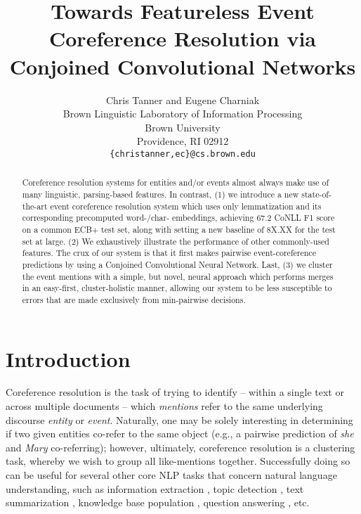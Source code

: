 \documentclass[11pt,a4paper]{article}
\title{Towards Featureless Event Coreference Resolution via Conjoined Convolutional Networks}
\author{Chris Tanner \textnormal{and} Eugene Charniak\\
Brown Linguistic Laboratory of Information Processing \\
  Brown University \\
  Providence, RI  02912 \\
  {\tt \{christanner,ec\}@cs.brown.edu} \\}
\date{}
\begin{document}
\maketitle
\begin{abstract}
Coreference resolution systems for entities and/or events almost always make use of many linguistic, parsing-based features.  In contrast, (1) we introduce a new state-of-the-art event coreference resolution system which uses only lemmatization and its corresponding precomputed word-/char- embeddings, achieving 67.2 CoNLL F1 score on a common ECB+ test set, along with setting a new baseline of 8X.XX for the test set at large. (2) We exhaustively illustrate the performance of other commonly-used features.  The crux of our system is that it first makes pairwise event-coreference predictions by using a Conjoined Convolutional Neural Network.  Last, (3) we cluster the event mentions with a simple, but novel, neural approach which performs merges in an easy-first, cluster-holistic manner, allowing our system to be less susceptible to errors that are made exclusively from min-pairwise decisions.
\end{abstract}

\section{Introduction}
Coreference resolution is the task of trying to identify -- within a single text or across multiple documents -- which \textit{mentions} refer to the same underlying discourse \textit{entity} or \textit{event}.  Naturally, one may be solely interesting in determining if two given entities co-refer to the same object (e.g., a pairwise prediction of \textit{she} and \textit{Mary} co-referring); however, ultimately, coreference resolution is a clustering task, whereby we wish to group all like-mentions together.  Successfully doing so can be useful for several other core NLP tasks that concern natural language understanding, such as information extraction \cite{Humphreys:1997}, topic detection \cite{Allan:1998}, text summarization \cite{Daniel:2003}, knowledge base population \cite{Cross_Document_Coreference_Resolution_A_Key_Technology_for_Learning_by_Reading}, question answering \cite{Narayanan:2004:QAB:1220355.1220455}, etc.
\end{document}
